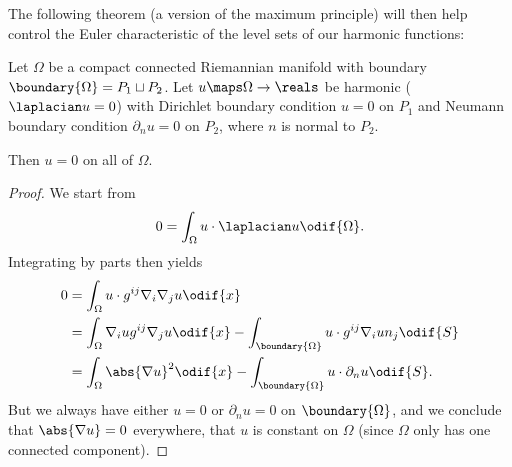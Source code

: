 \documentclass[titlepage,numbers=noenddot,headinclude,oneside,%
footinclude=true,cleardoublepage=empty,%
BCOR=5mm,paper=a4,fontsize=11pt,%
english,%
]{scrartcl}
\begin{document}
The following theorem (a version of the maximum principle) will then help control the Euler characteristic of the level sets of our harmonic functions:
\begin{theorem}\label{thm:maximum_principle}
 Let \( \Omega \) be a compact connected Riemannian manifold with boundary \( \boundary{\Omega}=P_1\sqcup P_2 \). Let \( u\maps \Omega\to \reals \) be harmonic (\ie \( \laplacian u=0 \)) with Dirichlet boundary condition \( u= 0 \) on \( P_1 \) and Neumann boundary condition \( \partial_n u=0 \) on \( P_2 \), where \( n \) is normal to \( P_2 \).

 Then \( u=0 \) on all of \( \Omega \).
\end{theorem}
\begin{proof}
    We start from
    \begin{equation*}
        0=\int_\Omega u\cdot \laplacian u\odif{\Omega}.
    \end{equation*}
    Integrating by parts then yields
    \begin{align*}
        0&=\int_\Omega u\cdot g^{ij}\nabla_i \nabla_j u\odif{x}\\
        &=\int_\Omega \nabla_i u g^{ij} \nabla_j u\odif{x}-\int_{\boundary{\Omega}}u\cdot g^{ij}\nabla_i u n_j \odif{S}\\
        &=\int_\Omega \abs{\nabla u}^2\odif{x}-\int_{\boundary{\Omega}}u\cdot \partial_n u\odif{S}.
    \end{align*}
    But we always have either \( u=0 \) or \( \partial_n u=0 \) on \( \boundary{\Omega} \), and we conclude that \( \abs{\nabla u}=0 \) everywhere, \ie that \( u \) is constant on \( \Omega \) (since \( \Omega \) only has one connected component).
\end{proof}
\end{document}
